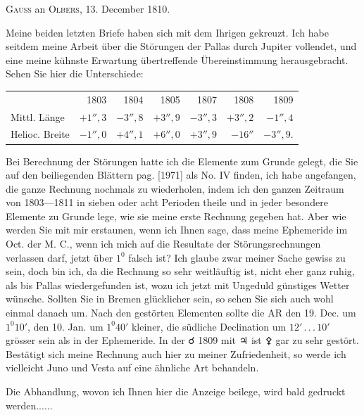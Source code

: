 \par\bigskip
{}
\begin{center}
\textsc{Gauss} an \textsc{Olbers}, 13. December 1810.
\end{center}
\noindent\hspace*{\parindent}Meine beiden letzten Briefe haben sich mit dem Ihrigen gekreuzt. Ich habe seitdem meine Arbeit über die Störungen der Pallas durch Jupiter vollendet, und eine meine kühnste Erwartung übertreffende Übereinstimmung herausgebracht. Sehen Sie hier die Unterschiede:
\begin{center}\begingroup\small\setlength{\tabcolsep}{4pt}
\begin{tabular}{lrrrrrr}
& 1803 & 1804 & 1805 & 1807 & 1808 & 1809\\
Mittl. Länge & \(+1''{,}3\) & \(-3''{,}8\) & \(+3''{,}9\) & \(-3''{,}3\) & \(+3''{,}2\) & \(-1''{,}4\)\\
Helioc. Breite & \(-1''{,}0\) & \(+4''{,}1\) & \(+6''{,}0\) & \(+3''{,}9\) & \(-16''\) & \(-3''{,}9.\)\\
\end{tabular}\endgroup\end{center}
\par
\noindent\hspace*{\parindent}Bei Berechnung der Störungen hatte ich die Elemente zum Grunde gelegt, die Sie auf den beiliegenden Blättern\HistoricalNoteEight{Band VI, S. 63.]} pag. [1971] als No. IV finden, ich habe angefangen, die ganze Rechnung nochmals zu wiederholen, indem ich den ganzen Zeitraum von 1803—1811 in sieben oder acht Perioden theile und in jeder besondere Elemente zu Grunde lege, wie sie meine erste Rechnung gegeben hat. Aber wie werden Sie mit mir erstaunen, wenn ich Ihnen sage, dass meine Ephemeride im Oct. der M. C., wenn ich mich auf die Resultate der Störungsrechnungen verlassen darf, jetzt über \(1^{0}\) falsch ist? Ich glaube zwar meiner Sache gewiss zu sein, doch bin ich, da die Rechnung so sehr weitläuftig ist, nicht eher ganz ruhig, als bis Pallas wiedergefunden ist, wozu ich jetzt mit Ungeduld günstiges Wetter wünsche. Sollten Sie in Bremen glücklicher sein, so sehen Sie sich auch wohl einmal danach um. Nach den gestörten Elementen sollte die AR den 19. Dec. um \(1^{0}10'\), den 10. Jan. um \(1^{0}40'\) kleiner, die südliche Declination um \(12'\,.\,.\,.\,10'\) grösser sein als in der Ephemeride. In der {\AstroSymbols ☌} 1809 mit {\AstroSymbols ♃} ist {\AstroSymbols ⚴} gar zu sehr gestört. Bestätigt sich meine Rechnung auch hier zu meiner Zufriedenheit, so werde ich vielleicht Juno und Vesta auf eine ähnliche Art behandeln.
\par
\noindent\hspace*{\parindent}Die Abhandlung, wovon ich Ihnen hier die Anzeige beilege, wird bald gedruckt werden.\quad.\quad.\quad.\quad.\quad.
\par

